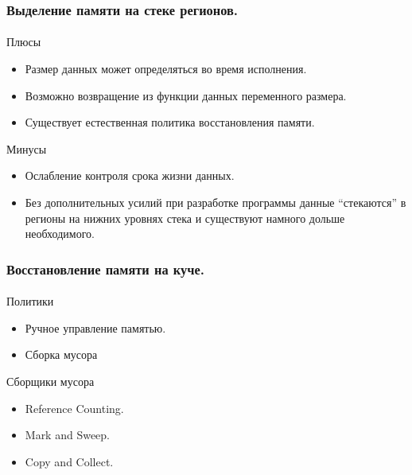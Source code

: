 \documentclass[ucs]{beamer}
\begin{document}
\begin{frame}[fragile]
  \frametitle{Выделение памяти на стеке регионов.}
  \framesubtitle{}
  \begin{block}{Плюсы}
    \begin{itemize}
    \item Размер данных может определяться во время исполнения.
    \item Возможно возвращение из функции данных переменного размера.
    \item Существует естественная политика восстановления памяти.
    \end{itemize}
  \end{block}

  \begin{block}{Минусы}
    \begin{itemize}
    \item Ослабление контроля срока жизни данных.
    \item Без дополнительных усилий при разработке программы данные
      ``стекаются'' в регионы на нижних уровнях стека и существуют намного
      дольше необходимого.
    \end{itemize}
  \end{block}
\end{frame}

\begin{frame}[fragile]
  \frametitle{Восстановление памяти на куче.}
  \framesubtitle{}
  \begin{block}{Политики}
    \begin{itemize}
    \item Ручное управление памятью.
    \item Сборка мусора
    \end{itemize}
  \end{block}

  \begin{block}{Сборщики мусора}
    \begin{itemize}
    \item Reference Counting.
    \item Mark and Sweep.
    \item Copy and Collect.
    \end{itemize}
  \end{block}
\end{frame}

\end{document}
